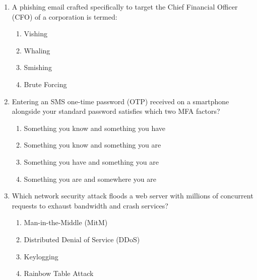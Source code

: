 \begin{enumerate}[leftmargin=1.5em]
    \item A phishing email crafted specifically to target the Chief Financial Officer (CFO) of a corporation is termed:
    \begin{enumerate}[label=(\alph*)]
        \item Vishing
        \item Whaling
        \item Smishing
        \item Brute Forcing
    \end{enumerate}

    \item Entering an SMS one-time password (OTP) received on a smartphone alongside your standard password satisfies which two MFA factors?
    \begin{enumerate}[label=(\alph*)]
        \item Something you know and something you have
        \item Something you know and something you are
        \item Something you have and something you are
        \item Something you are and somewhere you are
    \end{enumerate}

    \item Which network security attack floods a web server with millions of concurrent requests to exhaust bandwidth and crash services?
    \begin{enumerate}[label=(\alph*)]
        \item Man-in-the-Middle (MitM)
        \item Distributed Denial of Service (DDoS)
        \item Keylogging
        \item Rainbow Table Attack
    \end{enumerate}
\end{enumerate}

